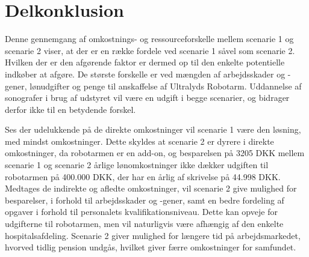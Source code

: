 \section{Delkonklusion}
Denne gennemgang af omkostnings- og ressourceforskelle mellem scenarie 1 og scenarie 2 viser, at der er en række fordele ved scenarie 1 såvel som scenarie 2. Hvilken der er den afgørende faktor er dermed op til den enkelte potentielle indkøber at afgøre. De største forskelle er ved mængden af arbejdsskader og -gener, lønudgifter og penge til anskaffelse af Ultralyds Robotarm. Uddannelse af sonografer i brug af udstyret vil være en udgift i begge scenarier, og bidrager derfor ikke til en betydende forskel. 

Ses der udelukkende på de direkte omkostninger vil scenarie 1 være den løsning, med mindst
omkostninger. Dette skyldes at scenarie 2 er dyrere i direkte omkostninger, da robotarmen er en
add-on, og besparelsen på 3205 DKK mellem scenarie 1 og scenarie 2 årlige lønomkostninger ikke dækker udgiften til robotarmen på 400.000 DKK, der har en årlig af skrivelse på 44.998 DKK. \\
Medtages de indirekte og afledte omkostninger, vil scenarie 2 give mulighed for besparelser, i forhold til arbejdsskader og -gener, samt en bedre fordeling af opgaver i forhold til personalets kvalifikationsniveau.  Dette kan opveje for udgifterne til robotarmen, men vil naturligvis være afhængig af den enkelte hospitalsafdeling. Scenarie 2 giver mulighed for længere tid på arbejdsmarkedet, hvorved tidlig pension undgås, hvilket giver færre omkostninger for samfundet.

